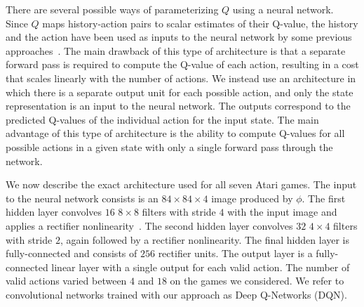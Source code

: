 There are several possible ways of parameterizing $Q$ using a neural network.  Since $Q$ maps history-action pairs to scalar estimates of their Q-value, the history and the action have been used as inputs to the neural network by some previous approaches~\cite{riedmiller-nfq,lange:dfq}.  The main drawback of this type of architecture is that a separate forward pass is required to compute the Q-value of each action, resulting in a cost that scales linearly with the number of actions.  We instead use an architecture in which there is a separate output unit for each possible action, and only the state representation is an input to the neural network.  The outputs correspond to the predicted Q-values of the individual action for the input state.  The main advantage of this type of architecture is the ability to compute Q-values for all possible actions in a given state with only a single forward pass through the network. 

We now describe the exact architecture used for all seven Atari games.
The input to the neural network consists is an $84 \times 84 \times 4$ image produced by $\phi$.  The first hidden layer convolves $16$ $8 \times 8$ filters with stride $4$ with the input image and applies a rectifier nonlinearity~\cite{jarrett-best,nair-relu}.  The second hidden layer convolves $32$ $4\times 4$ filters with stride $2$, again followed by a rectifier nonlinearity.  The final hidden layer is fully-connected and consists of $256$ rectifier units.  The output layer is a fully-connected linear layer with a single output for each valid action.  The number of valid actions varied between $4$ and $18$ on the games we considered.  We refer to convolutional networks trained with our approach as Deep Q-Networks (DQN).